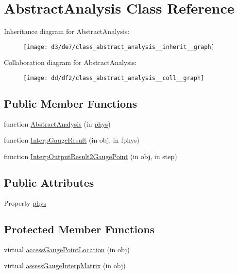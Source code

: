 \hypertarget{class_abstract_analysis}{}\section{Abstract\+Analysis Class Reference}
\label{class_abstract_analysis}


Inheritance diagram for Abstract\+Analysis\+:
\nopagebreak
\begin{figure}[H]
\begin{center}
\leavevmode
\texttt{[image: d3/de7/class\_abstract\_analysis\_\_inherit\_\_graph]}
\end{center}
\end{figure}


Collaboration diagram for Abstract\+Analysis\+:
\nopagebreak
\begin{figure}[H]
\begin{center}
\leavevmode
\texttt{[image: dd/df2/class\_abstract\_analysis\_\_coll\_\_graph]}
\end{center}
\end{figure}
\subsection*{Public Member Functions}
\begin{DoxyCompactItemize}
\item 
function \hyperlink{class_abstract_analysis_a05370192749aeff8a83230e3edb767af}{Abstract\+Analysis} (in \hyperlink{class_abstract_analysis_aa0d0d19a77f93d3ad8d25f4812d0b42f}{phys})
\item 
function \hyperlink{class_abstract_analysis_a2e6a5cd20bf646aa0a4636d021b4d4e6}{Interp\+Gauge\+Result} (in obj, in fphys)
\item 
function \hyperlink{class_abstract_analysis_a7f07dfe4405450e9a9969b7a59e12664}{Interp\+Output\+Result2\+Gauge\+Point} (in obj, in step)
\end{DoxyCompactItemize}
\subsection*{Public Attributes}
\begin{DoxyCompactItemize}
\item 
Property \hyperlink{class_abstract_analysis_aa0d0d19a77f93d3ad8d25f4812d0b42f}{phys}
\end{DoxyCompactItemize}
\subsection*{Protected Member Functions}
\begin{DoxyCompactItemize}
\item 
virtual \hyperlink{class_abstract_analysis_a7e27be73311a387a786791b96c1f8459}{access\+Gauge\+Point\+Location} (in obj)
\item 
virtual \hyperlink{class_abstract_analysis_afab5faf2b297303497bfd7a181ad4e8c}{assess\+Gauge\+Interp\+Matrix} (in obj)
\end{DoxyCompactItemize}
